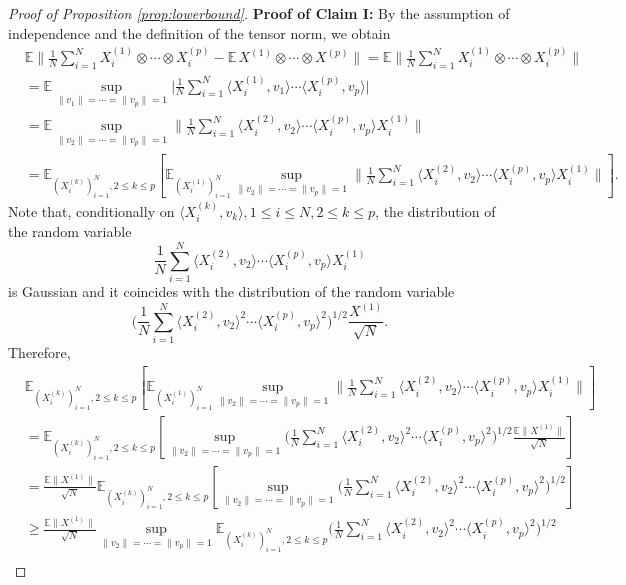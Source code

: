 \documentclass[numbers,webpdf,imaiai]{ima-authoring-template}
\theoremstyle{thmstyletwo}%
\numberwithin{equation}{section}
\numberwithin{equation}{section}
\newcommand{\E}{\mathbb{E}}
\begin{document}
\begin{proof}[Proof of Proposition \ref{prop:lowerbound}]
\textbf{Proof of Claim I:}
By the assumption of independence and the definition of the tensor norm, we obtain
\begin{align*}
&\E \bigg\|\frac{1}{N} \sum_{i=1}^N X_i^{(1)} \otimes \cdots \otimes X_i^{(p)}-\E\, X^{(1)} \otimes \cdots \otimes X^{(p)}\bigg\|=\E \bigg\|\frac{1}{N} \sum_{i=1}^N X_i^{(1)} \otimes \cdots \otimes X_i^{(p)}\bigg\| \\
&= \E \sup_{\|v_1\|= \cdots =\|v_p\|=1} \bigg| \frac{1}{N}\sum_{i=1}^N \langle X^{(1)}_i,v_1\rangle \cdots \langle X^{(p)}_i, v_p \rangle \bigg|\\
&= \E \sup_{\|v_2\|= \cdots =\|v_p\|=1}\bigg\| \frac{1}{N}\sum_{i=1}^N \langle X^{(2)}_i,v_2\rangle \cdots \langle X^{(p)}_i, v_p \rangle X_i^{(1)} \bigg\|\\
&=\E_{(X^{(k)}_i)_{i=1}^{N}, 2\le k\le p} \left[ \E_{(X^{(1)}_i)_{i=1}^{N}}  \sup_{\|v_2\|= \cdots =\|v_p\|=1}\bigg\| \frac{1}{N}\sum_{i=1}^N \langle X^{(2)}_i,v_2\rangle \cdots \langle X^{(p)}_i, v_p \rangle X_i^{(1)} \bigg\|\right].
\end{align*}
Note that, conditionally on $\langle X^{(k)}_i, v_k \rangle, 1\le i\le  N, 2\le k\le p$, the distribution of the random variable
\[
\frac{1}{N}\sum_{i=1}^N \langle X^{(2)}_i,v_2\rangle \cdots \langle X^{(p)}_i, v_p \rangle X_i^{(1)}
\]
is Gaussian and it coincides with the distribution of the random variable
\[
\bigg(\frac{1}{N} \sum_{i=1}^{N}\langle X^{(2)}_i, v_2\rangle^{2}\cdots \langle X^{(p)}_i, v_p\rangle^{2} \bigg)^{1 / 2} \frac{X^{(1)}}{\sqrt{N}}.
\]
Therefore,
\begin{align*}
    &\E_{(X^{(k)}_i)_{i=1}^{N}, 2\le k\le p} \left[ \E_{(X^{(1)}_i)_{i=1}^{N}}  \sup_{\|v_2\|= \cdots =\|v_p\|=1}\bigg\| \frac{1}{N}\sum_{i=1}^N \langle X^{(2)}_i,v_2\rangle \cdots \langle X^{(p)}_i, v_p \rangle X_i^{(1)} \bigg\|\right]\\
    &=\E_{(X^{(k)}_i)_{i=1}^{N}, 2\le k\le p} \left[ \sup_{\|v_2\|= \cdots =\|v_p\|=1}\bigg(\frac{1}{N} \sum_{i=1}^{N}\langle X^{(2)}_i, v_2\rangle^{2}\cdots \langle X^{(p)}_i, v_p\rangle^{2} \bigg)^{1 / 2} \frac{\E \|X^{(1)}\|}{\sqrt{N}}\right]\\
    &=\frac{\E \|X^{(1)}\|}{\sqrt{N}}\E_{(X^{(k)}_i)_{i=1}^{N}, 2\le k\le p}\left[ \sup_{\|v_2\|= \cdots =\|v_p\|=1}\bigg(\frac{1}{N} \sum_{i=1}^{N}\langle X^{(2)}_i, v_2\rangle^{2}\cdots \langle X^{(p)}_i, v_p\rangle^{2} \bigg)^{1 / 2} \right]\\
    &\ge \frac{\E \|X^{(1)}\|}{\sqrt{N}} \sup_{\|v_2\|= \cdots =\|v_p\|=1}\E_{(X^{(k)}_i)_{i=1}^{N}, 2\le k\le p}\bigg(\frac{1}{N} \sum_{i=1}^{N}\langle X^{(2)}_i, v_2\rangle^{2}\cdots \langle X^{(p)}_i, v_p\rangle^{2} \bigg)^{1 / 2}\\

\end{align*}
\end{proof}
\end{document}
